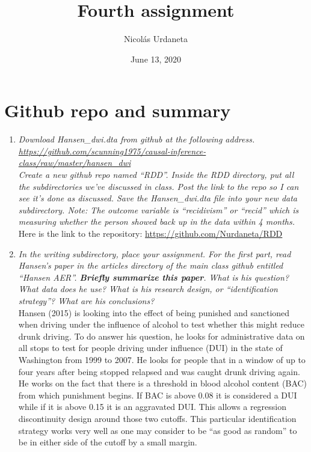 \documentclass[11pt, letterpaper]{article}
\title{\huge Fourth assignment}
\author{\LARGE Nicolás Urdaneta}
\date{June 13, 2020}
\begin{document}
\maketitle

\section*{Github repo and summary}

\begin{enumerate}
	\item {\itshape Download Hansen\_dwi.dta from github at the following address. \\
	\url{https://github.com/scunning1975/causal-inference-class/raw/master/hansen_dwi} \\
	Create a new github repo named ``RDD''.  Inside the RDD directory, put all the subdirectories we’ve discussed in class. Post the link to the repo so I can see it’s done as discussed.  Save the Hansen\_dwi.dta file into your new \/data subdirectory.  Note: The outcome variable is ``recidivism'' or ``recid'' which is measuring whether the person showed back up in the data within 4 months. } \\

	Here is the link to the repository:	\url{https://github.com/Nurdaneta/RDD}

	\item \textit{In the writing subdirectory, place your assignment.  For the first part, read Hansen’s paper in the \/articles directory of the main class github entitled ``Hansen AER''.  \textbf{Briefly summarize this paper}.  What is his question? What data does he use?  What is his research design, or “identification strategy”?  What are his conclusions? } \\

	Hansen (2015) is looking into the effect of being punished and sanctioned when driving under the influence of alcohol to test whether this might reduce drunk driving. To do answer his question, he looks for administrative data on all stops to test for people driving under influence (DUI) in the state of Washington from 1999 to 2007. He looks for people that in a window of up to four years after being stopped relapsed and was caught drunk driving again. \\

	He works on the fact that there is a threshold in blood alcohol content (BAC) from which punishment begins. If BAC is above 0.08 it is considered a DUI while if it is above 0.15 it is an aggravated DUI. This allows a regression discontinuity design around those two cutoffs. This particular identification strategy works very well as one may consider to be ``as good as random'' to be in either side of the cutoff by a small margin. \\


\end{enumerate}
\end{document}
